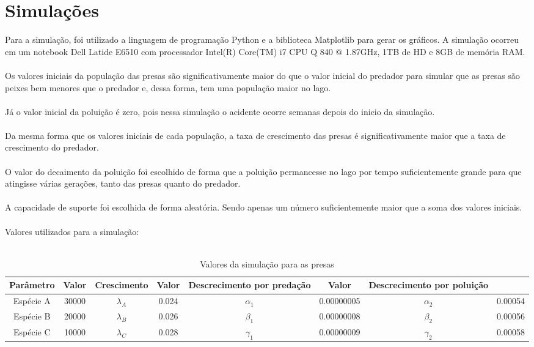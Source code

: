 \documentclass[a4paper]{article}
\begin{document}
\section{Simula\c{c}\~oes}
Para a simula\c{c}\~ao, foi utilizado a linguagem de programa\c{c}\~ao Python e a biblioteca Matplotlib para gerar os gr\'aficos. A simula\c{c}\~ao ocorreu em um notebook Dell Latide E6510 com processador Intel(R) Core(TM) i7 CPU Q 840 @ 1.87GHz, 1TB de HD e 8GB de mem\'oria RAM.
\\
\\
Os valores iniciais da popula\c{c}\~ao das presas s\~ao significativamente maior do que o valor inicial do predador para simular que as presas s\~ao peixes bem menores que o predador e, dessa forma, tem uma popula\c{c}\~ao maior no lago.
\\
\\
J\'a o valor inicial da polui\c{c}\~ao \'e zero, pois nessa simula\c{c}\~ao o acidente ocorre semanas depois do inicio da simula\c{c}\~ao.
\\
\\
Da mesma forma que os valores iniciais de cada popula\c{c}\~ao, a taxa de crescimento das presas \'e significativamente maior que a taxa de crescimento do predador.
\\
\\
O valor do decaimento da polui\c{c}\~ao foi escolhido de forma que a polui\c{c}\~ao permancesse no lago por tempo suficientemente grande para que atingisse v\'arias gera\c{c}\~oes, tanto das presas quanto do predador.
\\
\\
A capacidade de suporte foi escolhida de forma aleat\'oria. Sendo apenas um n\'umero suficientemente maior que a soma dos valores iniciais.
\\
\\
Valores utilizados para a simula\c{c}\~ao:
\\
\\
\begin{table}[ht!]
\centering
\caption{Valores da simula\c{c}\~ao para as presas}
\begin{tabular}{|c|c|c|c|c|c|c|c|}
Par\^ametro & Valor & Crescimento& Valor & Descrecimento por preda\c{c}\~ao & Valor& Descrecimento por polui\c{c}\~ao\\
\hline
Esp\'ecie A & 30000 & $\lambda_A$ & 0.024  & $\alpha_1  $ & 0.00000005  & $\alpha_2 $ & 0.00054   \\
Esp\'ecie B & 20000 & $\lambda_B$ & 0.026  & $\beta_1   $ & 0.00000008  & $\beta_2  $ & 0.00056 \\
Esp\'ecie C & 10000 & $\lambda_C$ & 0.028  & $\gamma_1  $ & 0.00000009  & $\gamma_2 $ & 0.00058  \\
\end{tabular}
\end{table}
\end{document}
